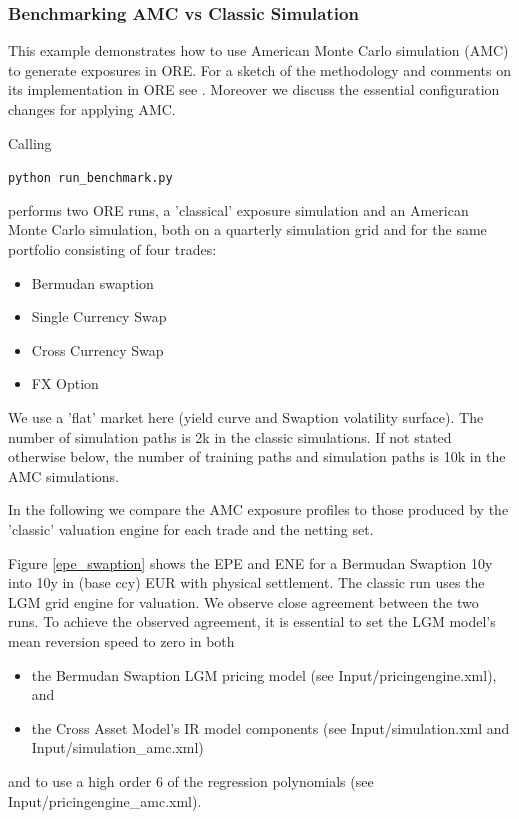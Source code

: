 \subsubsection{Benchmarking AMC vs Classic Simulation}

This example demonstrates how to use American Monte Carlo simulation (AMC) to generate exposures in ORE.
For a sketch of the methodology and comments on its implementation in ORE see \cite{methods}.
Moreover we discuss the essential configuration changes for applying AMC.

Calling

\medskip
\centerline {\tt python run\_benchmark.py}

\medskip
performs two ORE runs, a 'classical' exposure simulation and an American Monte Carlo simulation, both on a
quarterly simulation grid and for the same portfolio consisting of four trades:

\begin{itemize}
\item Bermudan swaption
\item Single Currency Swap
\item Cross Currency Swap
\item FX Option
\end{itemize}

We use a 'flat' market here (yield curve and Swaption volatility surface). The number of simulation paths
is 2k in the classic simulations. If not stated otherwise below, the number of training paths and simulation
paths is 10k in the AMC simulations.

In the following we compare the AMC exposure profiles to those produced by the 'classic' valuation engine
for each trade and the netting set.

Figure \ref{epe_swaption} shows the EPE and ENE for a Bermudan Swaption 10y into 10y in (base ccy) EUR with
physical settlement. The classic run uses the LGM grid engine for valuation. We observe close agreement between
the two runs. To achieve the observed agreement, it is essential to set the LGM model's mean reversion speed
to zero in both
\begin{itemize}
\item the Bermudan Swaption LGM pricing model (see Input/pricingengine.xml), and
\item the Cross Asset Model's IR model components (see Input/simulation.xml and Input/simulation\_amc.xml)
\end{itemize}
and to use a high order 6 of the regression polynomials (see Input/pricingengine\_amc.xml).

